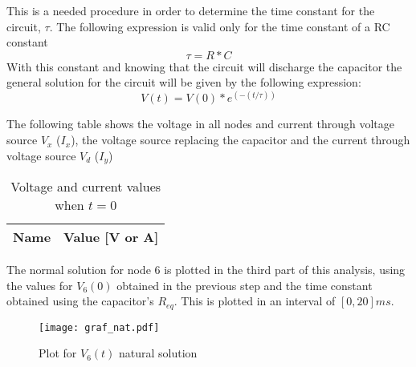 \vspace{20pt}
This is a needed procedure in order to determine the time constant for the circuit, $\tau$. The following expression is valid only for the time constant of a RC constant
\begin{equation}
\tau=R*C
\end{equation}
 With this constant and knowing that the circuit will discharge the capacitor the general solution for the circuit will be given by the following expression:
\begin{equation}
V(t)=V(0)*e^(-(t/\tau))
\end{equation}
\par
\par
The following table shows the voltage in all nodes and current through voltage source $V_x$ ($I_x$), the voltage source replacing the capacitor and the current through voltage source $V_d$ ($I_y$)
\par
\par
\begin{table}[H]
  \centering
  \begin{tabular}{|l|r|}
    \hline    
    {\bf Name} & {\bf Value [V or A]} \\ \hline
    
  \end{tabular}
  \caption{Voltage and current values when $t=0$}
  \label{tab:tcamp}
\end{table}
\vspace{20pt}
\par
\par
The normal solution for node 6 is plotted in the third part of this analysis, using the values for $V_6(0)$ obtained in the previous step and the time constant obtained using the capacitor's $R_{eq}$. This is plotted in an interval of $[0, 20]ms$.
\begin{figure}[h] \centering
\texttt{[image: graf\_nat.pdf]}
\caption{Plot for $V_6(t)$ natural solution}
\end{figure}

